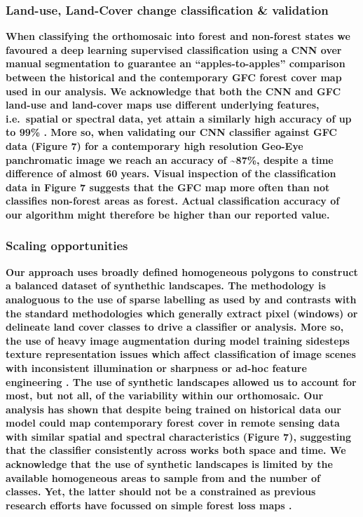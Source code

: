 \documentclass[remote sensing,article,submit,moreauthors,pdftex]{mdpi}
\begin{document}
\hypertarget{land-use-land-cover-change-classification-validation}{%
\subsubsection{Land-use, Land-Cover change classification \&
validation}\label{land-use-land-cover-change-classification-validation}}

\textbf{When classifying the orthomosaic into forest and non-forest
states we favoured a deep learning supervised classification using a CNN
over manual segmentation to guarantee an ``apples-to-apples'' comparison
between the historical and the contemporary GFC forest cover map used in
our analysis. We acknowledge that both the CNN and GFC land-use and
land-cover maps use different underlying features, i.e.~spatial or
spectral data, yet attain a similarly high accuracy of up to 99\%
\citep{hansen2013}. More so, when validating our CNN classifier against
GFC data (Figure 7) for a contemporary high resolution Geo-Eye
panchromatic image we reach an accuracy of \textasciitilde{}87\%,
despite a time difference of almost 60 years. Visual inspection of the
classification data in Figure 7 suggests that the GFC map more often
than not classifies non-forest areas as forest. Actual classification
accuracy of our algorithm might therefore be higher than our reported
value.}

\hypertarget{scaling-opportunities}{%
\subsubsection{Scaling opportunities}\label{scaling-opportunities}}

\textbf{Our approach uses broadly defined homogeneous polygons to
construct a balanced dataset of synthethic landscapes. The methodology
is analoguous to the use of sparse labelling as used by
\citet{buscombe2018} and contrasts with the standard methodologies which
generally extract pixel (windows) \citep{song2015} or delineate land
cover classes \citep{nita2018} to drive a classifier or analysis. More
so, the use of heavy image augmentation during model training sidesteps
texture representation issues which affect classification of image
scenes with inconsistent illumination or sharpness \citep{hudak1998} or
ad-hoc feature engineering \citep{song2015}. The use of synthetic
landscapes allowed us to account for most, but not all, of the
variability within our orthomosaic. Our analysis has shown that despite
being trained on historical data our model could map contemporary forest
cover in remote sensing data with similar spatial and spectral
characteristics (Figure 7), suggesting that the classifier consistently
across works both space and time. We acknowledge that the use of
synthetic landscapes is limited by the available homogeneous areas to
sample from and the number of classes. Yet, the latter should not be a
constrained as previous research efforts have focussed on simple forest
loss maps \citep{hansen2013}.}
\end{document}
